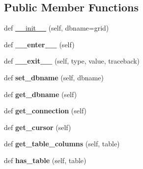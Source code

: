 \subsection*{Public Member Functions}
\begin{DoxyCompactItemize}
\item 
def \hyperlink{classasamba_1_1db__def_1_1grid__db_a12b1aeeefe8ddf8d57ccf1dcdcd005c9}{\+\_\+\+\_\+init\+\_\+\+\_\+} (self, dbname=\textquotesingle{}grid\textquotesingle{})
\item 
\mbox{\label{classasamba_1_1db__def_1_1grid__db_af2a0cdd429c6950b2249f82b5f7dfeef}} 
def {\bfseries \+\_\+\+\_\+enter\+\_\+\+\_\+} (self)
\item 
\mbox{\label{classasamba_1_1db__def_1_1grid__db_abc828560d7bb0461523e3fb37f39363e}} 
def {\bfseries \+\_\+\+\_\+exit\+\_\+\+\_\+} (self, type, value, traceback)
\item 
\mbox{\label{classasamba_1_1db__def_1_1grid__db_a43dc9b5ca0cf36c0a909c4e50d82b3e8}} 
def {\bfseries set\+\_\+dbname} (self, dbname)
\item 
\mbox{\label{classasamba_1_1db__def_1_1grid__db_a859f69f616f06e33cafc9ac0842b3565}} 
def {\bfseries get\+\_\+dbname} (self)
\item 
\mbox{\label{classasamba_1_1db__def_1_1grid__db_adc63edf75b2ea29a914e32b12dee1225}} 
def {\bfseries get\+\_\+connection} (self)
\item 
\mbox{\label{classasamba_1_1db__def_1_1grid__db_a29743c71be554a438f7fedeb4cce91c8}} 
def {\bfseries get\+\_\+cursor} (self)
\item 
\mbox{\label{classasamba_1_1db__def_1_1grid__db_ac2716d439ddf4f47cbfd28fb8a1d9f64}} 
def {\bfseries get\+\_\+table\+\_\+columns} (self, table)
\item 
\mbox{\label{classasamba_1_1db__def_1_1grid__db_a9fa0e10ef1c694ce6787ee9f5e8180fc}} 
def {\bfseries has\+\_\+table} (self, table)
\item 

\end{DoxyCompactItemize}
